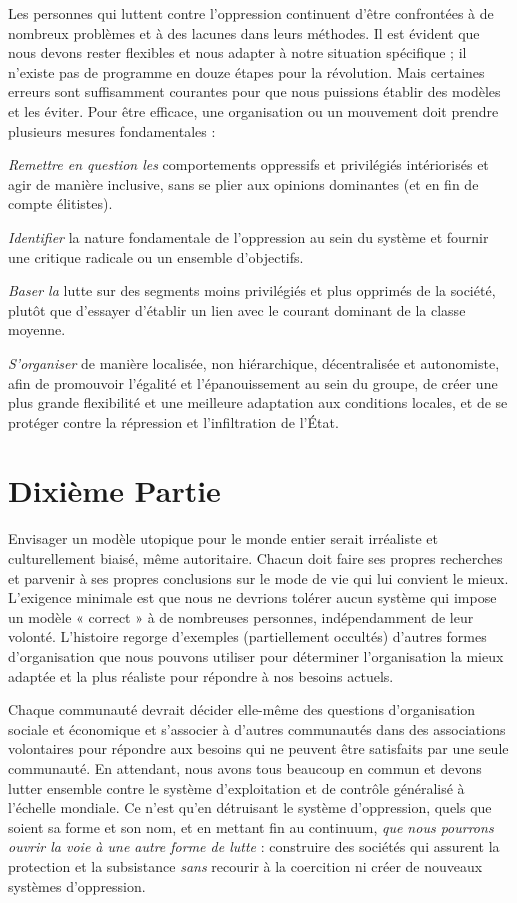 Les personnes qui luttent contre l'oppression continuent d'être confrontées à de nombreux problèmes et à des lacunes dans leurs méthodes. Il est évident que nous devons rester flexibles et nous adapter à notre situation spécifique ; il n'existe pas de programme en douze étapes pour la révolution. Mais certaines erreurs sont suffisamment courantes pour que nous puissions établir des modèles et les éviter. Pour être efficace, une organisation ou un mouvement doit prendre plusieurs mesures fondamentales :

\emph{Remettre en question les} comportements oppressifs et privilégiés intériorisés et agir de manière inclusive, sans se plier aux opinions dominantes (et en fin de compte élitistes).

\emph{Identifier} la nature fondamentale de l'oppression au sein du système et fournir une critique radicale ou un ensemble d'objectifs.

\emph{Baser la} lutte sur des segments moins privilégiés et plus opprimés de la société, plutôt que d'essayer d'établir un lien avec le courant dominant de la classe moyenne.

\emph{S'organiser} de manière localisée, non hiérarchique, décentralisée et autonomiste, afin de promouvoir l'égalité et l'épanouissement au sein du groupe, de créer une plus grande flexibilité et une meilleure adaptation aux conditions locales, et de se protéger contre la répression et l'infiltration de l'État.

\chapter*{\textbf{Dixième Partie}}\hypertarget{dixime-partie}{}\label{dixime-partie}

Envisager un modèle utopique pour le monde entier serait irréaliste et culturellement biaisé, même autoritaire. Chacun doit faire ses propres recherches et parvenir à ses propres conclusions sur le mode de vie qui lui convient le mieux. L'exigence minimale est que nous ne devrions tolérer aucun système qui impose un modèle « correct » à de nombreuses personnes, indépendamment de leur volonté. L'histoire regorge d'exemples (partiellement occultés) d'autres formes d'organisation que nous pouvons utiliser pour déterminer l'organisation la mieux adaptée et la plus réaliste pour répondre à nos besoins actuels.

Chaque communauté devrait décider elle-même des questions d'organisation sociale et économique et s'associer à d'autres communautés dans des associations volontaires pour répondre aux besoins qui ne peuvent être satisfaits par une seule communauté. En attendant, nous avons tous beaucoup en commun et devons lutter ensemble contre le système d'exploitation et de contrôle généralisé à l'échelle mondiale. Ce n'est qu'en détruisant le système d'oppression, quels que soient sa forme et son nom, et en mettant fin au continuum, \emph{que nous pourrons ouvrir la voie à une autre forme de lutte} : construire des sociétés qui assurent la protection et la subsistance \emph{sans} recourir à la coercition ni créer de nouveaux systèmes d'oppression.

